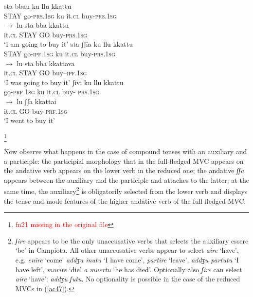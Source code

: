 \documentclass[output=paper]{langscibook}
\begin{document}
\ea\label{ac46}
    \ea\label{ac46a}
        \ea \label{ac46ai}\gll sta    bbau     ku   llu   kkattu\\
        STAY go-\textsc{prs}.\textsc{1sg}  ku   it.\textsc{cl} buy-\textsc{prs}.\textsc{1sg}   \\
        \ex \label{ac46aii}$\rightarrow$ \gll lu    sta    bba  kkattu\\
        it.\textsc{cl}  STAY GO  buy-\textsc{prs}.\textsc{1sg} \\
        \glt ‘I am going to buy it’
        \z
    \ex\label{ac46b}
        \ea  \label{ac46bi}\gll sta    ʃʃia       ku   llu    kkattu \\
       STAY go-\textsc{ipf}.\textsc{1sg}  ku   it.\textsc{cl}  buy-\textsc{prs}.\textsc{1sg}  \\
        \ex  \label{ac46bii}$\rightarrow$ \gll lu    sta    bba   kkattava\\
       it.\textsc{cl}   STAY GO   buy--\textsc{ipf}.\textsc{1sg}\\
       \glt ‘I was going to buy it’
        \z
    \ex\label{ac46c}
        \ea  \label{ac46ci}\gll ʃivi       ku   llu   kkattu \\
       go-\textsc{prf}.\textsc{1sg}  ku   it.\textsc{cl}  buy- \textsc{prs}.\textsc{1sg} \\
        \ex  \label{ac46cii}$\rightarrow$ \gll lu     ʃʃa   kkattai\\
       it.\textsc{cl}   GO  buy-\textsc{prf}.\textsc{1sg}\\
       \glt ‘I went to buy it’
        \z
    \z
\z

\footnote{\textcolor{red}{fn21 missing in the original file}}

Now observe what happens in the case of compound tenses with an auxiliary and a participle: the participial morphology that in the full-fledged MVC appears on the andative verb appears on the lower verb in the reduced one; the andative \textit{ʃʃa}  appears between the auxiliary and the participle and attaches to the latter; at the same time, the auxiliary\footnote{\textit{ʃire} appears to be the only unaccusative verbs that selects the auxiliary essere ‘be’ in Campiota.  All other unaccusative verbs appear to select \textit{aire} ‘have’, e.g. \textit{enire} ‘come’ \textit{addʒu inutu} ‘I have come’, \textit{partire} ‘leave’, \textit{addʒu partutu} ‘I have left’, \textit{murire} ‘die’ \textit{a muertu} ‘he has died’. Optionally also \textit{ʃire} can select \textit{aire} ‘have’: \textit{addʒu ʃutu}.  No optionality is possible in the case of the reduced MVCs in (\ref{ac47}).}  is obligatorily selected from the lower verb and displays the tense and mode features of the higher andative verb of the full-fledged MVC:
\end{document}
